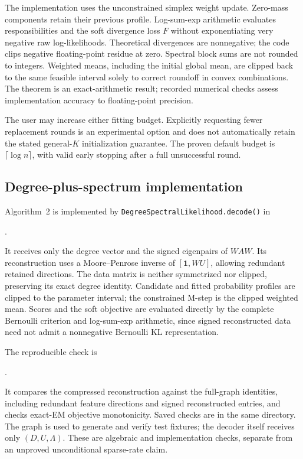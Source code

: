 \documentclass[11pt]{article}
\theoremstyle{definition}
\theoremstyle{remark}
\numberwithin{equation}{section}
\begin{document}
The implementation uses the unconstrained simplex weight update. Zero-mass components retain their previous profile. Log-sum-exp arithmetic evaluates responsibilities and the soft divergence loss $F$ without exponentiating very negative raw log-likelihoods. Theoretical divergences are nonnegative; the code clips negative floating-point residue at zero. Spectral block sums are not rounded to integers. Weighted means, including the initial global mean, are clipped back to the same feasible interval solely to correct roundoff in convex combinations. The theorem is an exact-arithmetic result; recorded numerical checks assess implementation accuracy to floating-point precision.

The user may increase either fitting budget. Explicitly requesting fewer replacement rounds is an experimental option and does not automatically retain the stated general-$K$ initialization guarantee. The proven default budget is $\lceil\log n\rceil$, with valid early stopping after a full unsuccessful round.

\subsection{Degree-plus-spectrum implementation}
Algorithm~2 is implemented by \texttt{DegreeSpectralLikelihood.decode()} in
\begin{center}
\small{}.
\end{center}
It receives only the degree vector and the signed eigenpairs of $WAW$. Its reconstruction uses a Moore--Penrose inverse of $[\mathbf1,WU]$, allowing redundant retained directions. The data matrix is neither symmetrized nor clipped, preserving its exact degree identity. Candidate and fitted probability profiles are clipped to the parameter interval; the constrained M-step is the clipped weighted mean. Scores and the soft objective are evaluated directly by the complete Bernoulli criterion and log-sum-exp arithmetic, since signed reconstructed data need not admit a nonnegative Bernoulli KL representation.

The reproducible check is
\begin{center}
\small{}.
\end{center}
It compares the compressed reconstruction against the full-graph identities, including redundant feature directions and signed reconstructed entries, and checks exact-EM objective monotonicity. Saved checks are in the same directory. The graph is used to generate and verify test fixtures; the decoder itself receives only $(D,U,\Lambda)$. These are algebraic and implementation checks, separate from an unproved unconditional sparse-rate claim.
\end{document}
